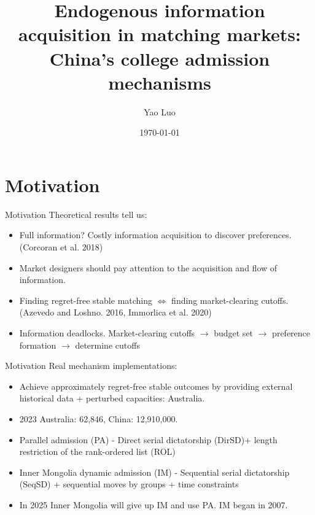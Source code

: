 \documentclass[dvipsnames,mathserif]{beamer}
\begin{document}
\rightskip\rightmargin
\title{Endogenous information acquisition in matching markets: China's college admission mechanisms}
\author{Yao Luo}


\footnotesize{\date{\today }


\begin{frame}
\maketitle
\end{frame}


%
\section{Motivation}
\begin{frame}{Motivation}
\large Theoretical results tell us:
\vspace{0.5cm}
    \begin{itemize}
        \item Full information? Costly information acquisition to discover preferences.(Corcoran et al. 2018) %
        \item Market designers should pay attention to the acquisition and flow of information.\\
        \item Finding regret-free stable matching $\Leftrightarrow$ finding market-clearing cutoffs.(Azevedo and Loshno. 2016, Immorlica et al. 2020)\\
        \item Information deadlocks. Market-clearing cutoffs $\rightarrow$ budget set $\rightarrow$ preference formation $\rightarrow$ determine cutoffs
    \end{itemize}
\end{frame}

\begin{frame}{Motivation}
\large Real mechanism implementations:
\vspace{0.5cm}
    \begin{itemize}
        \item Achieve approximately regret-free stable outcomes by providing external historical data + perturbed capacities: Australia.\\
        \item 2023 Australia: 62,846, China: 12,910,000. \\
        \item Parallel admission (PA) - Direct serial dictatorship (DirSD)+ length restriction of the rank-ordered list (ROL)\\
        \item Inner Mongolia dynamic admission (IM) - Sequential serial dictatorship (SeqSD) + sequential moves by groups + time constraints\\
        \item In 2025 Inner Mongolia will give up IM and use PA. IM began in 2007. 
    \end{itemize}
\end{frame}

}
\end{document}
